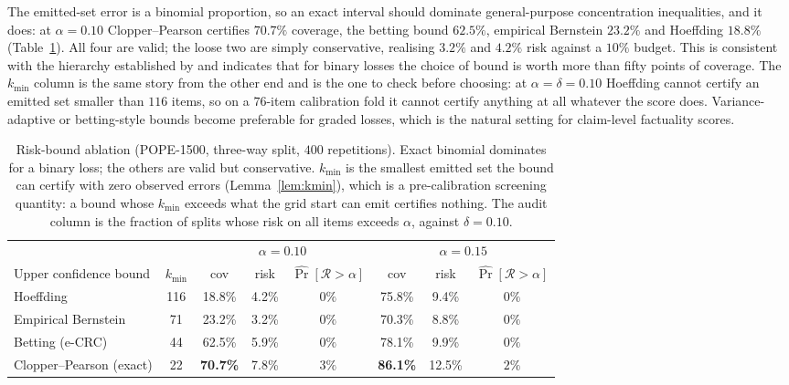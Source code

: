 \documentclass{article}
\theoremstyle{plain}
\theoremstyle{definition}
\theoremstyle{remark}
\newcommand{\Risk}{\mathcal{R}}
\begin{document}
The emitted-set error is a binomial proportion, so an exact interval should dominate
general-purpose concentration inequalities, and it does: at $\alpha=0.10$ Clopper--Pearson
certifies $70.7\%$ coverage, the betting bound $62.5\%$, empirical Bernstein $23.2\%$ and
Hoeffding $18.8\%$ (Table~\ref{tab:bounds}). All four are valid; the loose two are simply
conservative, realising $3.2\%$ and $4.2\%$ risk against a $10\%$ budget. This is consistent with
the hierarchy established by \citet{crcimposs} and indicates that for binary losses the choice of
bound is worth more than fifty points of coverage. The $k_{\min}$ column is the same story from
the other end and is the one to check before choosing: at $\alpha=\delta=0.10$ Hoeffding cannot
certify an emitted set smaller than $116$ items, so on a $76$-item calibration fold it cannot
certify anything at all whatever the score does. Variance-adaptive or betting-style bounds
\citep{waudbysmith2024} become preferable for graded losses, which is the natural setting for
claim-level factuality scores.

\begin{table}[t]
\centering
\caption{Risk-bound ablation (POPE-1500, three-way split, $400$ repetitions). Exact binomial
dominates for a binary loss; the others are valid but conservative. $k_{\min}$ is the smallest
emitted set the bound can certify with zero observed errors (Lemma~\ref{lem:kmin}), which is a
pre-calibration screening quantity: a bound whose $k_{\min}$ exceeds what the grid start can emit
certifies nothing. The audit column is the fraction of splits whose risk on all items exceeds
$\alpha$, against $\delta=0.10$.}
\label{tab:bounds}
\begin{tabular}{lccccccc}
\toprule
& & \multicolumn{3}{c}{$\alpha=0.10$} & \multicolumn{3}{c}{$\alpha=0.15$}\\
\cmidrule(lr){3-5}\cmidrule(lr){6-8}
Upper confidence bound & $k_{\min}$ & cov & risk & $\widehat{\Pr}[\Risk>\alpha]$
                                    & cov & risk & $\widehat{\Pr}[\Risk>\alpha]$\\
\midrule
Hoeffding                & 116 & 18.8\% & 4.2\% & $0\%$ & 75.8\% & 9.4\%  & $0\%$\\
Empirical Bernstein      &  71 & 23.2\% & 3.2\% & $0\%$ & 70.3\% & 8.8\%  & $0\%$\\
Betting (e-CRC)          &  44 & 62.5\% & 5.9\% & $0\%$ & 78.1\% & 9.9\% & $0\%$\\
Clopper--Pearson (exact) &  22 & \textbf{70.7\%} & 7.8\% & $3\%$ & \textbf{86.1\%} & 12.5\% & $2\%$\\
\bottomrule
\end{tabular}
\end{table}
\end{document}
